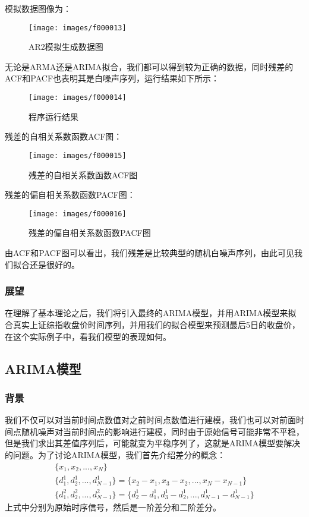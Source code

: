 模拟数据图像为：
\begin{figure}[H]
	\caption{AR2模拟生成数据图}
	\label{f000013}
	\centering
	\texttt{[image: images/f000013]}
\end{figure}
无论是ARMA还是ARIMA拟合，我们都可以得到较为正确的数据，同时残差的ACF和PACF也表明其是白噪声序列，运行结果如下所示：
\begin{figure}[H]
	\caption{程序运行结果}
	\label{f000014}
	\centering
	\texttt{[image: images/f000014]}
\end{figure}
残差的自相关系数函数ACF图：
\begin{figure}[H]
	\caption{残差的自相关系数函数ACF图}
	\label{f000015}
	\centering
	\texttt{[image: images/f000015]}
\end{figure}
残差的偏自相关系数函数PACF图：
\begin{figure}[H]
	\caption{残差的偏自相关系数函数PACF图}
	\label{f000016}
	\centering
	\texttt{[image: images/f000016]}
\end{figure}
由ACF和PACF图可以看出，我们残差是比较典型的随机白噪声序列，由此可见我们拟合还是很好的。
\subsubsection{展望}
在理解了基本理论之后，我们将引入最终的ARIMA模型，并用ARIMA模型来拟合真实上证综指收盘价时间序列，并用我们的拟合模型来预测最后5日的收盘价，在这个实际例子中，看我们模型的表现如何。
\subsection{ARIMA模型}
\subsubsection{背景}
我们不仅可以对当前时间点数值对之前时间点数值进行建模，我们也可以对前面时间点随机噪声对当前时间点的影响进行建模，同时由于原始信号可能非常不平稳，但是我们求出其差值序列后，可能就变为平稳序列了，这就是ARIMA模型要解决的问题。为了讨论ARIMA模型，我们首先介绍差分的概念：
\begin{equation}
\begin{aligned}
\{ x_1,x_2,...,x_N \} \\
\{d_1^{1},d_2^{1},...,d_{N-1}^{1}\}=\{x_2-x_1,x_3-x_2,...,x_{N}-x_{N-1}\} \\
\{d_1^{2},d_2^{2},...,d_{N-1}^{2}\}=\{d_2^{1}-d_1^{1},d_3^{1}-d_2^{1},...,d_{N-1}^{1}-d_{N-1}^{1}\}
\end{aligned}
\label{e000030}
\end{equation}
上式中分别为原始时序信号，然后是一阶差分和二阶差分。
